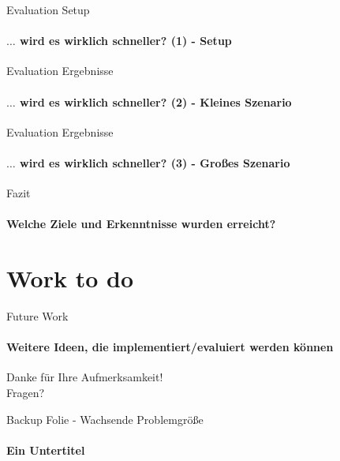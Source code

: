 \documentclass[
	german,%
	aspectratio=169,%
	accentcolor=1b,
	logo=true,%
	colorframetitle=true,%
	authorontitle=true,
	usepdftitle=false,
	design=2008,
	]{tudabeamer}
\begin{document}
\begin{frame}{Evaluation Setup}
	\framesubtitle{$\ldots$ wird es wirklich schneller? (1) - Setup}
	\label{results-setup}
	
\end{frame}

\begin{frame}{Evaluation Ergebnisse}
	\framesubtitle{$\ldots$ wird es wirklich schneller? (2) - Kleines Szenario}
	\label{results-1}
	
\end{frame}

\begin{frame}{Evaluation Ergebnisse}
	\framesubtitle{$\ldots$ wird es wirklich schneller? (3) - Großes Szenario}
	\label{results-2}
	
	\end{frame}

\begin{frame}[fragile]{Fazit}
	\framesubtitle{Welche Ziele und Erkenntnisse wurden erreicht?}
	\label{conclusion}
	
\end{frame}

\section{Work to do}

\begin{frame}{Future Work}
	\framesubtitle{Weitere Ideen, die implementiert/evaluiert werden können}
	\label{future-work}
	\vspace{2em}
	
\end{frame}

\begin{frame}[c]{}
	\label{thank-you}
	\centering
	\vspace{3em}
	\LARGE
	Danke für Ihre Aufmerksamkeit!\\
	Fragen?
\end{frame}

%
%

\begin{frame}{Backup Folie - Wachsende Problemgröße}
	\framesubtitle{Ein Untertitel}
	\label{problem-size}
	
\end{frame}
\end{document}
